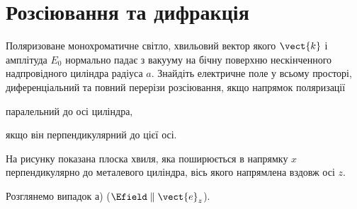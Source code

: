 
\section{Розсіювання та дифракція}

\begin{problem}\label{prb:Zang_metall_Cyllinder}%
Поляризоване монохроматичне світло, хвильовий вектор якого $\vect{k}$  і амплітуда $E_0$ нормально падає з вакууму на бічну поверхню нескінченного надпровідного циліндра радіуса $a$. Знайдіть електричне поле у всьому просторі, диференціальний та повний перерізи розсіювання, якщо напрямок поляризації
\begin{enumerate*}[label=\alph*)]
\item паралельний до осі циліндра,
\item якщо він перпендикулярний до цієї осі.
\end{enumerate*}
\begin{solution}
	На рисунку показана плоска хвиля, яка поширюється в напрямку $x$ перпендикулярно до металевого циліндра, вісь якого напрямлена вздовж осі $z$.

	\begin{center}
	\end{center}

    Розглянемо випадок а) ($\Efield \parallel \vect{e}_z$).


\end{solution}
\end{problem}
